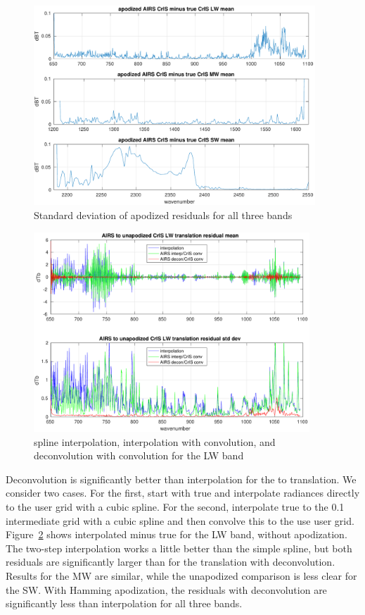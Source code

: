 \documentclass[11pt]{article}
\begin{document}
\begin{figure} %
  \centering
  \includegraphics[height=7.5cm]{figures/combo_ap_dif_std.pdf}
  \caption{Standard deviation of apodized residuals for all three
    {\cris} bands}
  \label{stdAll}
\end{figure}

\begin{figure} %
  \centering
  \includegraphics[height=7.5cm]{figures/a2cris_interp_LW.pdf}
  \caption{spline interpolation, interpolation with convolution, 
    and deconvolution with convolution for the {\cris} LW band}
  \label{intpLW}
\end{figure}

Deconvolution is significantly better than interpolation for the
{\airs} to {\cris} translation.  We consider two cases.  For the
first, start with true {\airs} and interpolate radiances directly 
to the {\cris} user grid with a cubic spline.  For the second,
interpolate true {\airs} to the 0.1 {\wn} intermediate grid with a
cubic spline and then convolve this to the use {\cris} user grid.
Figure~\ref{intpLW} shows interpolated {\cris} minus true {\cris}
for the LW band, without apodization.  The two-step interpolation
works a little better than the simple spline, but both residuals are
significantly larger than for the translation with deconvolution.
Results for the MW are similar, while the unapodized comparison is
less clear for the SW.  With Hamming apodization, the residuals with
deconvolution are significantly less than interpolation for all
three bands.
\end{document}
